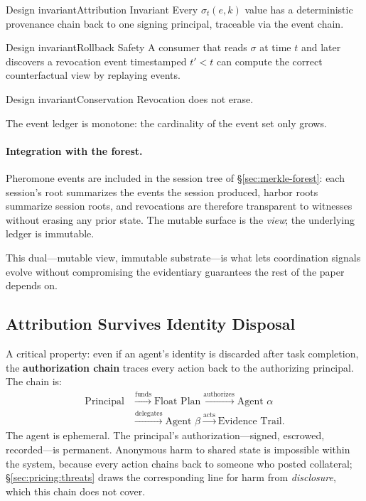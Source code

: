 \documentclass[11pt,a4paper]{article}
\theoremstyle{definition}
\theoremstyle{remark}
\begin{document}
\begin{pdclaim}{Design invariant}{Attribution Invariant}
\setlength{\parskip}{4pt plus 1pt}
\label{prop:pheromone-attribution}
Every $\sigma_t(e,k)$ value has a deterministic provenance chain back to one signing principal, traceable via the event chain.
\end{pdclaim}

\begin{pdclaim}{Design invariant}{Rollback Safety}
\setlength{\parskip}{4pt plus 1pt}
\label{prop:pheromone-rollback}
A consumer that reads $\sigma$ at time $t$ and later discovers a revocation event timestamped $t' < t$ can compute the correct counterfactual view by replaying events.
\end{pdclaim}

\begin{pdclaim}{Design invariant}{Conservation}
\setlength{\parskip}{4pt plus 1pt}
\label{prop:pheromone-conservation}
Revocation does not erase. 

The event ledger is monotone: the cardinality of the event set only grows.
\end{pdclaim}

\paragraph{Integration with the forest.} Pheromone events are included in the session tree of \S\ref{sec:merkle-forest}: each session's root summarizes the events the session produced, harbor roots summarize session roots, and revocations are therefore transparent to witnesses without erasing any prior state. The mutable surface is the \emph{view}; the underlying ledger is immutable.

This dual---mutable view, immutable substrate---is what lets coordination signals evolve without compromising the evidentiary guarantees the rest of the paper depends on.

\subsection{Attribution Survives Identity Disposal}\label{sec:attribution-survives}

A critical property: even if an agent's identity is discarded after task completion, the \textbf{authorization chain} traces every action back to the authorizing principal. The chain is:
\[
\begin{aligned}
\text{Principal} &\xrightarrow{\text{funds}} \text{Float Plan} \xrightarrow{\text{authorizes}} \text{Agent } \alpha\\
&\xrightarrow{\text{delegates}} \text{Agent } \beta \xrightarrow{\text{acts}} \text{Evidence Trail}.
\end{aligned}
\]
The agent is ephemeral. The principal's authorization---signed, escrowed, recorded---is permanent. Anonymous harm to shared state is impossible within the system, because every action chains back to someone who posted collateral; \S\ref{sec:pricing:threats} draws the corresponding line for harm from \emph{disclosure}, which this chain does not cover.
\end{document}

